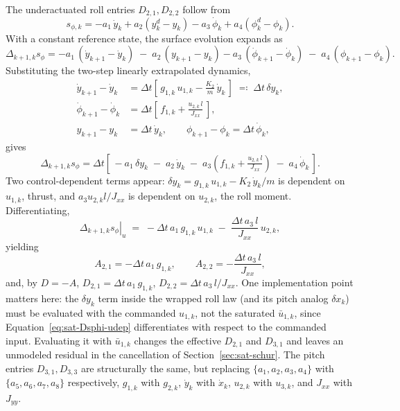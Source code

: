 \documentclass[conf]{new-aiaa}
\begin{document}
The underactuated roll entries $D_{2,1}, D_{2,2}$ follow from
\small
\begin{equation}
\label{eq:sat-sphi}
s_{\phi,k} = -a_1\,\dot y_k + a_2(y_k^d - y_k) - a_3\,\dot\phi_k + a_4(\phi_k^d - \phi_k).
\end{equation}
\normalsize
With a constant reference state, the surface evolution expands as
\small
\begin{equation}
\Delta_{k+1,k} s_\phi
= -a_1\,(\dot y_{k+1} - \dot y_k) \;-\; a_2\,(y_{k+1} - y_k)
- a_3\,(\dot\phi_{k+1} - \dot\phi_k) \;-\; a_4\,(\phi_{k+1} - \phi_k).
\end{equation}
\normalsize
Substituting the two-step linearly extrapolated dynamics,
\small
\begin{align}
\dot y_{k+1} - \dot y_k
&= \Delta t\!\left[\, g_{1,k}\, u_{1,k} - \tfrac{K_2}{m}\,\dot y_k \,\right] \;\eqqcolon\; \Delta t\, \delta y_k, \\
\dot\phi_{k+1} - \dot\phi_k
&= \Delta t\!\left[\, f_{1,k} + \tfrac{u_{2,k}\, l}{J_{xx}} \,\right], \\
y_{k+1} - y_k &= \Delta t\, \dot y_k,
\qquad
\phi_{k+1} - \phi_k = \Delta t\, \dot\phi_k,
\end{align}
\normalsize
gives
\small
\begin{equation}
\label{eq:sat-Dsphi}
\Delta_{k+1,k} s_\phi = \Delta t \!\left[\,
-a_1\,\delta y_k \;-\; a_2\,\dot y_k \;-\; a_3\!\left( f_{1,k} + \tfrac{u_{2,k}\, l}{J_{xx}} \right) \;-\; a_4\,\dot\phi_k
\,\right].
\end{equation}
\normalsize
Two control-dependent terms appear: $\delta y_k = g_{1,k}\, u_{1,k} - K_2\,\dot y_k/m$ is dependent on $u_{1,k}$, thrust, and $a_3 u_{2,k} l/J_{xx}$ is dependent on $u_{2,k}$, the roll moment. Differentiating,
\small
\begin{equation}
\label{eq:sat-Dsphi-udep}
\left.\Delta_{k+1,k} s_\phi\right|_u
\;=\; -\Delta t\, a_1\, g_{1,k}\, u_{1,k}
\;-\;
\frac{\Delta t\, a_3\, l}{J_{xx}}\, u_{2,k},
\end{equation}
\normalsize
yielding
\begin{equation}
\label{eq:sat-A-roll}
A_{2,1} = -\Delta t\, a_1\, g_{1,k},
\qquad
A_{2,2} = -\frac{\Delta t\, a_3\, l}{J_{xx}},
\end{equation}
and, by $D = -A$, $D_{2,1} = \Delta t\, a_1\, g_{1,k}$, $D_{2,2} = \Delta t\, a_3\, l/J_{xx}$. One implementation point matters here: the $\delta y_k$ term inside the wrapped roll law (and its pitch analog $\delta x_k$) must be evaluated with the commanded $u_{1,k}$, not the saturated $\bar u_{1,k}$, since Equation~\ref{eq:sat-Dsphi-udep} differentiates with respect to the commanded input. Evaluating it with $\bar u_{1,k}$ changes the effective $D_{2,1}$ and $D_{3,1}$ and leaves an unmodeled residual in the cancellation of Section~\ref{sec:sat-schur}. The pitch entries $D_{3,1}, D_{3,3}$ are structurally the same, but replacing $\{a_1, a_2, a_3, a_4\}$ with $\{a_5, a_6, a_7, a_8\}$ respectively, $g_{1,k}$ with $g_{2,k}$, $\dot y_k$ with $\dot x_k$, $u_{2,k}$ with $u_{3,k}$, and $J_{xx}$ with $J_{yy}$.
\end{document}
